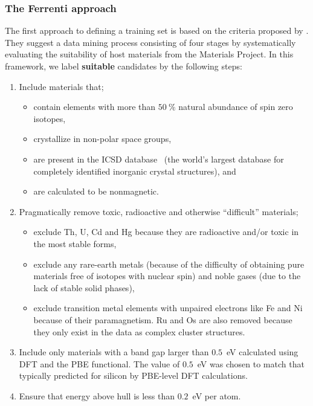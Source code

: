 \documentclass[superscriptaddress,unsortedaddress,
 amsmath,amssymb,
 aps,
]{revtex4-2}
\begin{document}
\subsubsection*{The Ferrenti approach}
The first approach to defining a training set is based on the criteria proposed by \citeauthor{Ferrenti2020} \cite{Ferrenti2020}.
They suggest a data mining process consisting of four stages by systematically evaluating the suitability of host materials from the Materials Project. In this framework, we label \textbf{suitable} candidates by the following steps:
\begin{enumerate}
    \item Include materials that;
    \begin{itemize}
        \item contain elements with more than $50 \ \%$ natural abundance of spin zero isotopes,
        \item crystallize in non-polar space groups,
        \item are present in the ICSD database~\cite{Allen1987} (the world's largest database for completely identified inorganic crystal structures), and
        \item are calculated to be nonmagnetic. 
    \end{itemize}
    \item Pragmatically remove toxic, radioactive and otherwise ``difficult'' materials;
    \begin{itemize}
        \item exclude Th, U, Cd and Hg because they are radioactive and/or toxic in the most stable forms,
        \item exclude any rare-earth metals (because of the difficulty of obtaining pure materials free of isotopes with nuclear spin) and noble gases (due to the lack of stable solid phases),
        \item exclude transition metal elements with unpaired electrons like Fe and Ni because of their paramagnetism. Ru and Os are also removed because they only exist in the data as complex cluster structures. 
    \end{itemize}
    \item Include only materials with a band gap larger than $0.5$~eV calculated using DFT and the PBE functional. The value of $0.5$~eV was chosen to match that typically predicted for silicon by PBE-level DFT calculations. 
    \item Ensure that energy above hull is less than $0.2$~eV per atom.
\end{enumerate}
\end{document}
